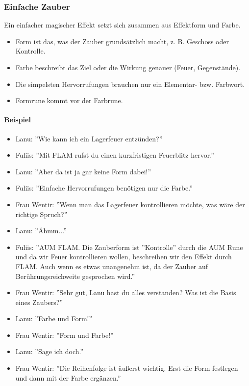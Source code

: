\documentclass{article}
\begin{document}
\subsubsection{Einfache Zauber}

Ein einfacher magischer Effekt setzt sich zusammen aus Effektform und Farbe.

\begin{itemize}
\item Form ist das, was der Zauber grundsätzlich macht, z. B. Geschoss oder Kontrolle.
\item Farbe beschreibt das Ziel oder die Wirkung genauer (Feuer, Gegenstände).
\item Die simpelsten Hervorrufungen brauchen nur ein Elementar- bzw. Farbwort.
\item Formrune kommt vor der Farbrune.
\end{itemize}

\paragraph{Beispiel}

\begin{itemize}
\item Lanu: ''Wie kann ich ein Lagerfeuer entzünden?''
\item Fuliis: ''Mit FLAM rufst du einen kurzfristigen Feuerblitz hervor.''
\item Lanu: ''Aber da ist ja gar keine Form dabei!''
\item Fuliis: ''Einfache Hervorrufungen benötigen nur die Farbe.''
\item Frau Wentir: ''Wenn man das Lagerfeuer kontrollieren möchte, was wäre der richtige Spruch?''
\item Lanu: ''Ähmm...''
\item Fuliis: ''AUM FLAM. Die Zauberform ist ''Kontrolle'' durch die AUM Rune und da wir Feuer kontrollieren wollen, beschreiben wir den Effekt durch FLAM. Auch wenn es etwas unangenehm ist, da der Zauber auf Berührungsreichweite gesprochen wird.''
\item Frau Wentir: ''Sehr gut, Lanu hast du alles verstanden? Was ist die Basis eines Zaubers?''
\item Lanu: ''Farbe und Form!''
\item Frau Wentir: ''Form und Farbe!''
\item Lanu: ''Sage ich doch.''
\item Frau Wentir: ''Die Reihenfolge ist äußerst wichtig. Erst die Form festlegen und dann mit der Farbe ergänzen.''
\end{itemize}
\end{document}
